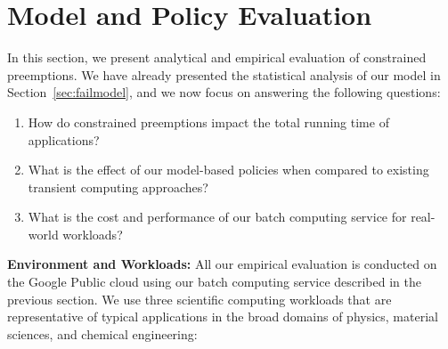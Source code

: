 \vspace*{\subsecspace}
\section{Model and Policy Evaluation}
\label{sec:eval}

%


In this section, we present analytical and empirical evaluation of constrained preemptions.
We have already presented the statistical analysis of our model in Section~\ref{sec:failmodel}, and we now focus on answering the following questions: 

\begin{enumerate}
\item How do constrained preemptions impact the total running time of applications?

\item  What is the effect of our model-based policies when compared to existing transient computing approaches?


\item What is the cost and performance of our batch computing service for real-world workloads? 
  
\end{enumerate}




\noindent \textbf{Environment and Workloads:}
All our empirical evaluation is conducted on the Google Public cloud using our batch computing service described in the previous section. 
We use three scientific computing workloads that are representative of typical applications in the broad domains of physics, material sciences, and chemical engineering:

